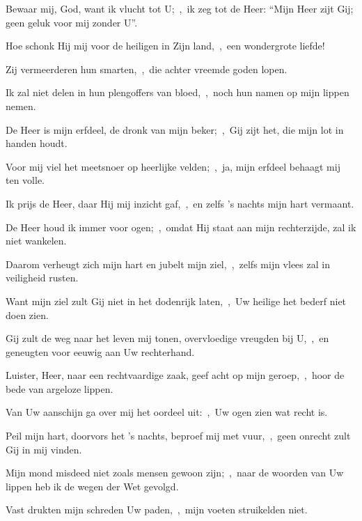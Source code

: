 \documentclass[12pt,twoside,a5paper]{article}
\begin{document}
\begin{halfparskip}
  Bewaar mij, God, want ik vlucht tot U;~\sep\ ik zeg tot de Heer: ``Mijn Heer zijt Gij; geen geluk voor mij zonder U''.


  Hoe schonk Hij mij voor de heiligen in Zijn land,~\sep\ een wondergrote liefde!

  Zij vermeerderen hun smarten,~\sep\ die achter vreemde goden lopen.

  Ik zal niet delen in hun plengoffers van bloed,~\sep\ noch hun namen op mijn lippen nemen.

  De Heer is mijn erfdeel, de dronk van mijn beker;~\sep\ Gij zijt het, die mijn lot in handen houdt.

  Voor mij viel het meetsnoer op heerlijke velden;~\sep\ ja, mijn erfdeel behaagt mij ten volle.
\end{halfparskip}


\begin{halfparskip}
  Ik prijs de Heer, daar Hij mij inzicht gaf,~\sep\ en zelfs 's nachts mijn hart vermaant.

  De Heer houd ik immer voor ogen;~\sep\ omdat Hij staat aan mijn rechterzijde, zal ik niet wankelen.

  Daarom verheugt zich mijn hart en jubelt mijn ziel,~\sep\ zelfs mijn vlees zal in veiligheid rusten.

  Want mijn ziel zult Gij niet in het dodenrijk laten,~\sep\ Uw heilige het bederf niet doen zien.

  Gij zult de weg naar het leven mij tonen, overvloedige vreugden bij U,~\sep\ en geneugten voor eeuwig aan Uw rechterhand.
\end{halfparskip}



\begin{halfparskip}
  Luister, Heer, naar een rechtvaardige zaak, geef acht op mijn geroep,~\sep\ hoor de bede van argeloze lippen.


  Van Uw aanschijn ga over mij het oordeel uit:~\sep\ Uw ogen zien wat recht is.

  Peil mijn hart, doorvors het 's nachts, beproef mij met vuur,~\sep\ geen onrecht zult Gij in mij vinden.

  Mijn mond misdeed niet zoals mensen gewoon zijn;~\sep\ naar de woorden van Uw lippen heb ik de wegen der Wet gevolgd.

  Vast drukten mijn schreden Uw paden,~\sep\ mijn voeten struikelden niet.
\end{halfparskip}
\end{document}
